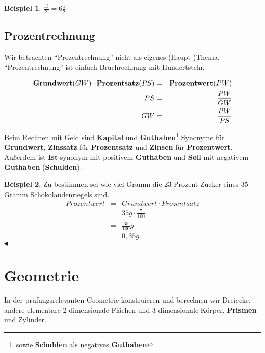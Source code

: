 \documentclass[a4paper]{book}%
\newcommand{\topicend}{
      $\blacktriangleleft$
}
\theoremstyle{definition}
\newtheorem{beispiel}{Beispiel}
\begin{document}
\begin{beispiel}
    $\frac{13}{2} = 6 \frac{1}{2}$
\end{beispiel}


\section{Prozentrechnung}\label{Prozentrechnung}

Wir betrachten \enquote{Prozentrechnung} nicht als eigenes (Haupt-)Thema. \enquote{Prozentrechnung} ist einfach Bruchrechnung mit Hundertsteln.

\begin{eqnarray}
  \text{\textbf{Grundwert}} (GW) \cdot \text{\textbf{Prozentsatz}} (PS) &=& \text{\textbf{Prozentwert}} (PW)\\
  PS &=& \frac{PW}{GW} \\
  GW &=& \frac{PW}{PS}
\end{eqnarray}

Beim Rechnen mit Geld sind \textbf{Kapital} und \textbf{Guthaben}\footnote{sowie \textbf{Schulden} als negatives \textbf{Guthaben}} Synonyme für \textbf{Grundwert}, \textbf{Zinssatz} für \textbf{Prozentsatz} und \textbf{Zinsen} für \textbf{Prozentwert}. Außerdem ist \textbf{Ist} synonym mit positivem \textbf{Guthaben} und \textbf{Soll} mit negativem \textbf{Guthaben} (\textbf{Schulden}).

\begin{beispiel}
    Zu bestimmen sei wie viel Gramm die 23 Prozent Zucker eines 35 Gramm Schokolandenriegels sind.
    \begin{eqnarray}
      Prozentwert &=& Grundwert \cdot Prozentsatz \\
       &=& 35g \cdot \frac{7}{100} \\
       &=& \frac{35}{100}g\\
       &=& 0,35g
    \end{eqnarray}\topicend
\end{beispiel}


\chapter{Geometrie}

In der prüfungsrelevanten Geometrie konstruieren und berechnen wir Dreiecke, andere elementare 2-dimensionale Flächen und 3-dimensionale Körper, \textbf{Prismen} und Zylinder.
\end{document}
